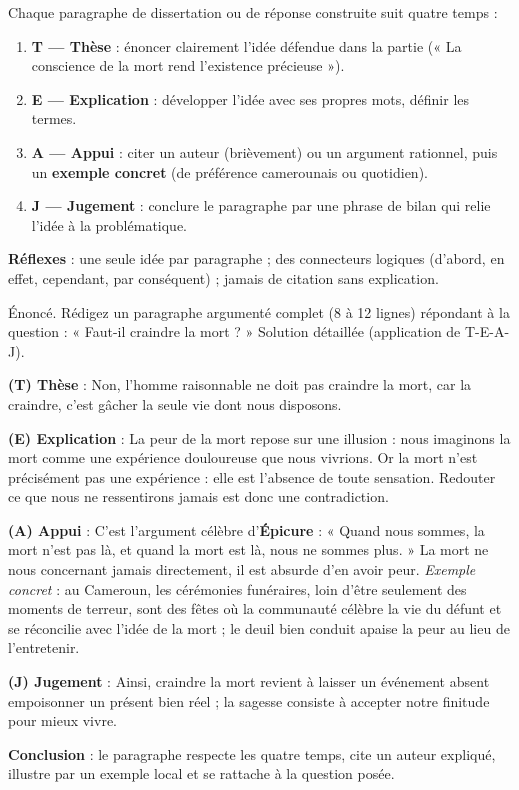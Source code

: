 \documentclass[11pt]{article}
\begin{document}
\begin{methode}
Chaque paragraphe de dissertation ou de réponse construite suit quatre temps :
\begin{enumerate}
\item \textbf{T — Thèse} : énoncer clairement l'idée défendue dans la partie (« La conscience de la mort rend l'existence précieuse »).
\item \textbf{E — Explication} : développer l'idée avec ses propres mots, définir les termes.
\item \textbf{A — Appui} : citer un auteur (brièvement) ou un argument rationnel, puis un \textbf{exemple concret} (de préférence camerounais ou quotidien).
\item \textbf{J — Jugement} : conclure le paragraphe par une phrase de bilan qui relie l'idée à la problématique.
\end{enumerate}
\textbf{Réflexes} : une seule idée par paragraphe ; des connecteurs logiques (d'abord, en effet, cependant, par conséquent) ; jamais de citation sans explication.
\end{methode}

\begin{exoresolu}
Énoncé. Rédigez un paragraphe argumenté complet (8 à 12 lignes) répondant à la question : « Faut-il craindre la mort ? »
\tcblower
Solution détaillée (application de T-E-A-J).

\textbf{(T) Thèse} : Non, l'homme raisonnable ne doit pas craindre la mort, car la craindre, c'est gâcher la seule vie dont nous disposons.

\textbf{(E) Explication} : La peur de la mort repose sur une illusion : nous imaginons la mort comme une expérience douloureuse que nous vivrions. Or la mort n'est précisément pas une expérience : elle est l'absence de toute sensation. Redouter ce que nous ne ressentirons jamais est donc une contradiction.

\textbf{(A) Appui} : C'est l'argument célèbre d'\textbf{Épicure} : « Quand nous sommes, la mort n'est pas là, et quand la mort est là, nous ne sommes plus. » La mort ne nous concernant jamais directement, il est absurde d'en avoir peur. \emph{Exemple concret} : au Cameroun, les cérémonies funéraires, loin d'être seulement des moments de terreur, sont des fêtes où la communauté célèbre la vie du défunt et se réconcilie avec l'idée de la mort ; le deuil bien conduit apaise la peur au lieu de l'entretenir.

\textbf{(J) Jugement} : Ainsi, craindre la mort revient à laisser un événement absent empoisonner un présent bien réel ; la sagesse consiste à accepter notre finitude pour mieux vivre.

\textbf{Conclusion} : le paragraphe respecte les quatre temps, cite un auteur expliqué, illustre par un exemple local et se rattache à la question posée.
\end{exoresolu}
\end{document}
